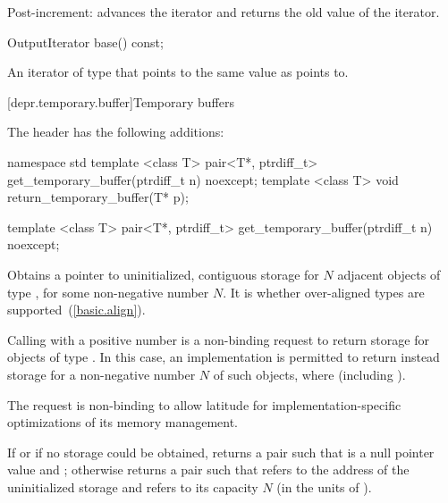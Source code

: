 \begin{itemdescr}
\pnum
\effects
Post-increment:  advances the iterator and returns the old value of the iterator.
\end{itemdescr}

\begin{itemdecl}
OutputIterator base() const;
\end{itemdecl}

\begin{itemdescr}
\pnum
\returns
An iterator of type  that points to the same value as
 points to.
\end{itemdescr}

[depr.temporary.buffer]{Temporary buffers}

\pnum
The header  has the following additions:

\begin{codeblock}
namespace std {
  template <class T>
    pair<T*, ptrdiff_t> get_temporary_buffer(ptrdiff_t n) noexcept;
  template <class T>
    void return_temporary_buffer(T* p);
}
\end{codeblock}

%
\begin{itemdecl}
template <class T>
  pair<T*, ptrdiff_t> get_temporary_buffer(ptrdiff_t n) noexcept;
\end{itemdecl}

\begin{itemdescr}
\pnum
\effects
Obtains a pointer to uninitialized, contiguous storage for $N$ adjacent
objects of type , for some non-negative number $N$.
It is  whether over-aligned types are
supported~(\ref{basic.align}).

\pnum
\remarks
Calling  with a positive number  is
a non-binding request to return storage for  objects of type .
In this case, an implementation is permitted to return instead storage for
a non-negative number $N$ of such objects,
where  (including ).
\begin{note} The request is non-binding to allow latitude for
implementation-specific optimizations of its memory management. \end{note}

\pnum
\returns
If  or if no storage could be obtained,
returns a pair  such that
 is a null pointer value and ;
otherwise returns a pair  such that
 refers to the address of the uninitialized storage and
 refers to its capacity $N$ (in the units of ).
\end{itemdescr}

